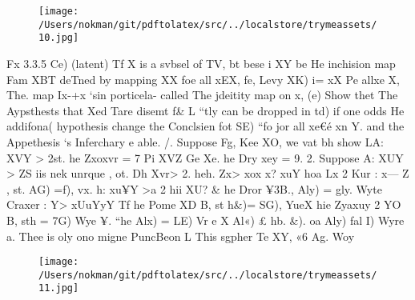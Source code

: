 \documentclass[a4paper,12pt]{article}
\begin{document}
\vspace{10pt}

\par

\vspace{10pt}

\begin{figure}[h]

\texttt{[image: /Users/nokman/git/pdftolatex/src/../localstore/trymeassets/10.jpg]}

\centering

\end{figure}

\par

\vspace{10pt}

    Fx 3.3.5 Ce) (latent)   Tf X is a svbsel of TV, bt bese i XY be He inchision map Fam XBT  deTned by mapping XX foe all xEX, fe, Levy XK) i= xX Pe allxe X,   The. map Ix-+x ‘sin porticela- called The jdeitity map on x,    (e) Show thet The Aypsthests that Xed Tare disemt f\& L “tly  can be dropped in td) if one odds He addifona( hypothesis change the  Conclsien  fot SE) “fo jor all xe€é xn Y. and the Appethesis  ‘s Inferchary e able.    /. Suppose Fg, Kee XO, we vat bh show LA: XVY > 2st. he Zxoxvr = 7  Pi XVZ Ge Xe. he Dry xey = 9.    2. Suppose A: XUY > ZS iis nek unrque , ot. Dh Xvr> 2. heh.    Zx> xox x? xuY hoa Lx 2 Kur : x— Z , st. AG) =f), vx.  h: xu¥Y >a 2  hii XU? \& he Dror ¥3B., Aly) = gly. Wyte    Craxer : Y> xUuYyY    Tf he Pome XD B, st h\&)= SG), YueX  hie Zyaxuy 2 YO B, sth = 7G) Wye ¥.  “he Alx) = LE) Vr e X Al«) £ hb. \&).    oa    Aly) fal I) Wyre a.    Thee is oly ono migne PuncBeon L This sgpher Te XY, «6 Ag. Woy 

\vspace{10pt}

\par

\vspace{10pt}

\begin{figure}[h]

\texttt{[image: /Users/nokman/git/pdftolatex/src/../localstore/trymeassets/11.jpg]}

\centering

\end{figure}

\par

\vspace{10pt}
\end{document}
